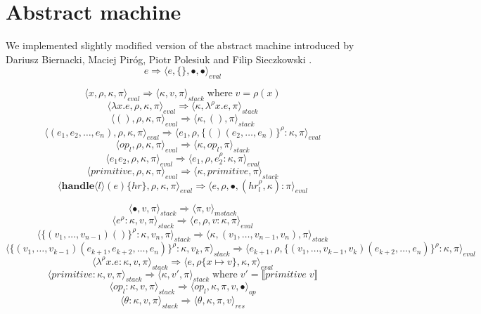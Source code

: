 \documentclass[a4paper]{article}
\begin{document}
\section{Abstract machine}
We implemented slightly modified version of the abstract machine introduced by
Dariusz Biernacki, Maciej Piróg, Piotr Polesiuk and Filip Sieczkowski \cite{HandleWithCare}.
$$e \Rightarrow \langle e, \{\}, \bullet, \bullet \rangle_{eval} $$

$$\langle x, \rho, \kappa, \pi \rangle_\mathit{eval} \Rightarrow
  \langle \kappa, v, \pi \rangle_\mathit{stack} \; \text{where} \; v = \rho(x)$$
$$\langle \lambda x.e, \rho, \kappa, \pi \rangle_\mathit{eval} \Rightarrow
  \langle \kappa, \lambda^\rho x.e, \pi \rangle_\mathit{stack}$$
$$\langle (), \rho, \kappa, \pi \rangle_\mathit{eval} \Rightarrow
  \langle \kappa, (), \pi \rangle_\mathit{stack}$$
$$\langle (e_1, e_2, \dots, e_n), \rho, \kappa, \pi \rangle_\mathit{eval} \Rightarrow
   \langle e_1, \rho, \{() (e_2, \dots, e_n) \}^\rho : \kappa, \pi \rangle_\mathit{eval}$$
$$\langle \mathit{op}_l, \rho, \kappa, \pi \rangle_\mathit{eval} \Rightarrow \langle \kappa, \mathit{op}_l, \pi \rangle_\mathit{stack}$$
$$\langle e_1 e_2, \rho, \kappa, \pi \rangle_\mathit{eval} \Rightarrow
   \langle e_1, \rho, e_2^\rho : \kappa, \pi \rangle_\mathit{eval}$$
$$\langle \mathit{primitive}, \rho, \kappa, \pi \rangle_\mathit{eval} \Rightarrow
  \langle \kappa, \mathit{primitive}, \pi \rangle_\mathit{stack}$$
$$\langle \textbf{handle$\langle l\rangle$}(e)\{\mathit{hr}\}, \rho, \kappa, \pi \rangle_\mathit{eval} \Rightarrow
  \langle e, \rho, \bullet, (\mathit{hr}_l^\rho, \kappa) : \pi \rangle_\mathit{eval}$$

$$\langle \bullet, v, \pi \rangle_\mathit{stack} \Rightarrow \langle \pi, v \rangle_\mathit{mstack}$$
$$\langle e^\rho : \kappa, v, \pi \rangle_\mathit{stack} \Rightarrow
  \langle e, \rho, v : \kappa, \pi \rangle_\mathit{eval}$$
$$\langle \{(v_1, \dots, v_{n-1})()\}^\rho : \kappa, v_n, \pi \rangle_\mathit{stack} \Rightarrow
  \langle \kappa, (v_1, \dots, v_{n-1}, v_n), \pi \rangle_\mathit{stack}$$
$$\langle \{(v_1, \dots, v_{k-1})(e_{k+1}, e_{k+2}, \dots, e_n)\}^\rho : \kappa, v_k, \pi \rangle_\mathit{stack} \Rightarrow
  \langle e_{k+1}, \rho, \{(v_1, \dots, v_{k-1}, v_k) (e_{k+2}, \dots, e_n) \}^\rho : \kappa, \pi \rangle_\mathit{eval}$$
$$\langle \lambda^\rho x.e : \kappa, v, \pi \rangle_\mathit{stack} \Rightarrow
  \langle e, \rho\{x \mapsto v\}, \kappa, \pi \rangle_\mathit{eval}$$
$$\langle \mathit{primitive} : \kappa, v, \pi \rangle_\mathit{stack} \Rightarrow
  \langle \kappa, v', \pi \rangle_\mathit{stack}  \; \text{where} \; v' = \llbracket \mathit{primitive} \; v \rrbracket$$
$$\langle \mathit{op}_l : \kappa, v, \pi \rangle_\mathit{stack} \Rightarrow
  \langle \mathit{op}_l, \kappa, \pi, v, \bullet \rangle_\mathit{op}$$
$$\langle \theta : \kappa, v, \pi \rangle_\mathit{stack} \Rightarrow
  \langle \theta , \kappa, \pi, v \rangle_\mathit{res}$$
\end{document}
